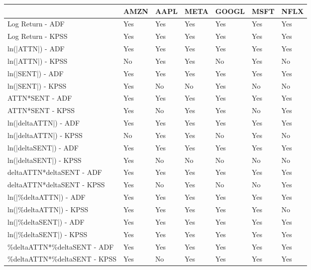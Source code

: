 \begin{tabular}{lllllll}
\toprule
{} & AMZN & AAPL & META & GOOGL & MSFT & NFLX \\
\midrule
Log Return - ADF             &  Yes &  Yes &  Yes &   Yes &  Yes &  Yes \\
Log Return - KPSS            &  Yes &  Yes &  Yes &   Yes &  Yes &  Yes \\
ln(|ATTN|) - ADF             &  Yes &  Yes &  Yes &   Yes &  Yes &  Yes \\
ln(|ATTN|) - KPSS            &   No &  Yes &  Yes &    No &  Yes &   No \\
ln(|SENT|) - ADF             &  Yes &  Yes &  Yes &   Yes &  Yes &  Yes \\
ln(|SENT|) - KPSS            &  Yes &   No &   No &   Yes &   No &   No \\
ATTN*SENT - ADF              &  Yes &  Yes &  Yes &   Yes &  Yes &  Yes \\
ATTN*SENT - KPSS             &  Yes &   No &  Yes &   Yes &   No &  Yes \\
ln(|deltaATTN|) - ADF        &  Yes &  Yes &  Yes &   Yes &  Yes &  Yes \\
ln(|deltaATTN|) - KPSS       &   No &  Yes &  Yes &    No &  Yes &   No \\
ln(|deltaSENT|) - ADF        &  Yes &  Yes &  Yes &   Yes &  Yes &  Yes \\
ln(|deltaSENT|) - KPSS       &  Yes &   No &   No &    No &   No &   No \\
deltaATTN*deltaSENT - ADF    &  Yes &  Yes &  Yes &   Yes &  Yes &  Yes \\
deltaATTN*deltaSENT - KPSS   &  Yes &   No &  Yes &    No &   No &  Yes \\
ln(|\%deltaATTN|) - ADF       &  Yes &  Yes &  Yes &   Yes &  Yes &  Yes \\
ln(|\%deltaATTN|) - KPSS      &  Yes &  Yes &  Yes &   Yes &  Yes &   No \\
ln(|\%deltaSENT|) - ADF       &  Yes &  Yes &  Yes &   Yes &  Yes &  Yes \\
ln(|\%deltaSENT|) - KPSS      &  Yes &  Yes &  Yes &   Yes &  Yes &  Yes \\
\%deltaATTN*\%deltaSENT - ADF  &  Yes &  Yes &  Yes &   Yes &  Yes &  Yes \\
\%deltaATTN*\%deltaSENT - KPSS &  Yes &   No &  Yes &   Yes &  Yes &  Yes \\
\bottomrule
\end{tabular}
